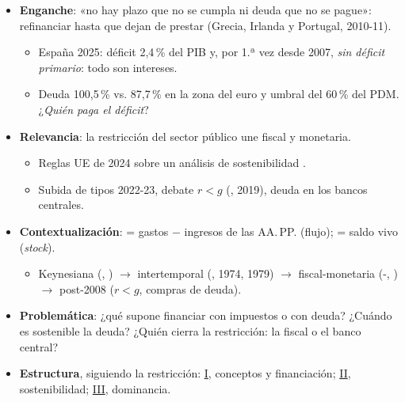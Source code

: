 \documentclass{article}
\begin{document}
\cabecerarepaso
\begin{columnas}

\begin{itemize}
\item \textbf{Enganche}: «no hay plazo que no se cumpla ni deuda que no se pague»: refinanciar hasta que dejan de prestar (Grecia, Irlanda y Portugal, 2010-11).
  \begin{itemize}
  \item España 2025: déficit 2,4\,\% del PIB y, por 1.ª vez desde 2007, \emph{sin déficit primario}: todo son intereses.
  \item Deuda 100,5\,\% vs. 87,7\,\% en la zona del euro y umbral del 60\,\% del PDM. ¿\emph{Quién paga el déficit}?
  \end{itemize}
\item \textbf{Relevancia}: la restricción del sector público une fiscal y monetaria.
  \begin{itemize}
  \item Reglas UE de 2024 sobre un análisis de sostenibilidad .
  \item Subida de tipos 2022-23, debate $r<g$ (, 2019), deuda en los bancos centrales.
  \end{itemize}
\item \textbf{Contextualización}:  = gastos $-$ ingresos de las AA.\,PP. (flujo);  = saldo vivo (\emph{stock}).
  \begin{itemize}
  \item Keynesiana (, ) $\to$ intertemporal (, 1974, 1979) $\to$ fiscal-monetaria (-, ) $\to$ post-2008 ($r<g$, compras de deuda).
  \end{itemize}
\item \textbf{Problemática}: ¿qué supone financiar con impuestos o con deuda? ¿Cuándo es sostenible la deuda? ¿Quién cierra la restricción: la fiscal o el banco central?
\item \textbf{Estructura}, siguiendo la restricción: \hyperref[rep:I]{I}, conceptos y financiación; \hyperref[rep:II]{II}, sostenibilidad; \hyperref[rep:III]{III}, dominancia.
\end{itemize}


\end{columnas}
\end{document}
